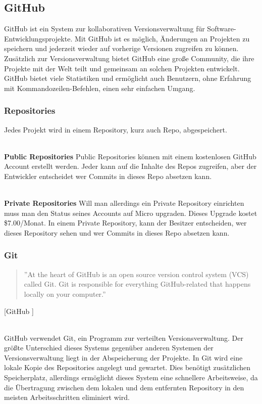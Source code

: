 \documentclass[FIPLY_base.tex]{subfiles}
\begin{document}
\subsection{GitHub}
GitHub ist ein System zur kollaborativen Versionsverwaltung für Software-Entwicklungsprojekte.
Mit GitHub ist es möglich, Änderungen an Projekten zu speichern und jederzeit wieder auf vorherige Versionen zugreifen zu können.
Zusätzlich zur Versionsverwaltung bietet GitHub eine große Community, die ihre Projekte mit der Welt teilt und gemeinsam an solchen Projekten entwickelt.
GitHub bietet viele Statistiken und ermöglicht auch Benutzern, ohne Erfahrung mit Kommandozeilen-Befehlen, einen sehr einfachen Umgang. 

\subsubsection{Repositories}
Jedes Projekt wird in einem Repository, kurz auch Repo, abgespeichert.

\ \\
\textbf{Public Repositories}  \newline
Public Repositories können mit einem kostenlosen GitHub Account erstellt werden.
Jeder kann auf die Inhalte des Repos zugreifen, aber der Entwickler entscheidet wer Commits in dieses Repo absetzen kann.

\ \\
\textbf{Private Repositories} \newline
Will man allerdings ein Private Repository einrichten muss man den Status seines Accounts auf Micro upgraden.
Dieses Upgrade kostet \$7.00/Monat. In einem Private Repository, kann der Besitzer entscheiden, wer dieses Repository sehen und wer Commits in dieses Repo absetzen kann.

\subsubsection{Git}
\begin{quote}
''At the heart of GitHub is an open source version control system (VCS) called Git. Git is responsible for everything GitHub-related that happens locally on your computer.''
\end{quote}
[GitHub \cite{githubSetUpGit}]

\ \\
GitHub verwendet Git, ein Programm zur verteilten Versionsverwaltung.
Der größte Unterschied dieses Systems gegenüber anderen Systemen der Versionsverwaltung liegt in der Abspeicherung der Projekte.
In Git wird eine lokale Kopie des Repositories angelegt und gewartet.
Dies benötigt zusätzlichen Speicherplatz, allerdings ermöglicht dieses System eine schnellere Arbeitsweise, da die Übertragung zwischen dem lokalen und dem entfernten Repository in den meisten Arbeitsschritten eliminiert wird. 
\end{document}
